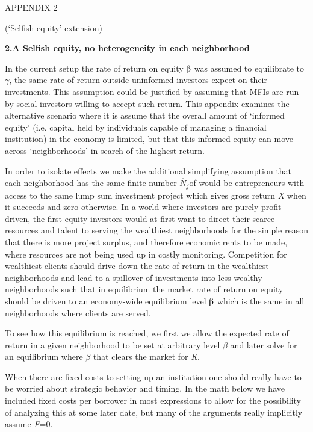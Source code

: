 \documentclass{article} %
\begin{document}
\noindent APPENDIX 2

\noindent (`Selfish equity' extension)

\noindent \textbf{2.A  Selfish equity, no heterogeneity in each neighborhood}

\noindent In the current setup the rate of return on equity $\mathrm{\betaup }$ was assumed to equilibrate to $\gamma$, the same rate of return outside uninformed investors expect on their investments.  This assumption could be justified by assuming that MFIs are run by social investors willing to accept such return. This appendix examines the alternative scenario where it is assume that the overall amount of `informed equity' (i.e. capital held by individuals capable of managing a financial institution) in the economy is limited, but that this informed equity can move across `neighborhoods' in search of the highest return.

\noindent In order to isolate effects we make the additional simplifying assumption that each neighborhood has the same finite number $\overline{N}_{j} $of would-be entrepreneurs with access to the same lump sum investment project which gives gross return \textit{X} when it succeeds and zero otherwise.  In a world where investors are purely profit driven, the first equity investors would at first want to direct their scarce resources and talent to serving the wealthiest neighborhoods for the simple reason that there is more project surplus, and therefore economic rents to be made, where resources are not being used up in costly monitoring.  Competition for wealthiest clients should drive down the rate of return in the wealthiest neighborhoods and lead to a spillover of investments into less wealthy neighborhoods such that in equilibrium the market rate of return on equity should be driven to an economy-wide equilibrium level $\betaup$ which is the same in all neighborhoods where clients are served.       

\noindent To see how this equilibrium is reached, we first we allow the expected rate of return in a given neighborhood to be set at arbitrary level $\beta$ and later solve for an equilibrium where $\beta$ that clears the market for \textit{K}.  

\noindent When there are fixed costs to setting up an institution one should really have to be worried about strategic behavior and timing.  In the math below we have included fixed costs per borrower in most expressions to allow for the possibility of analyzing this at some later date, but many of the arguments really implicitly assume \textit{F}=0.
\end{document}
